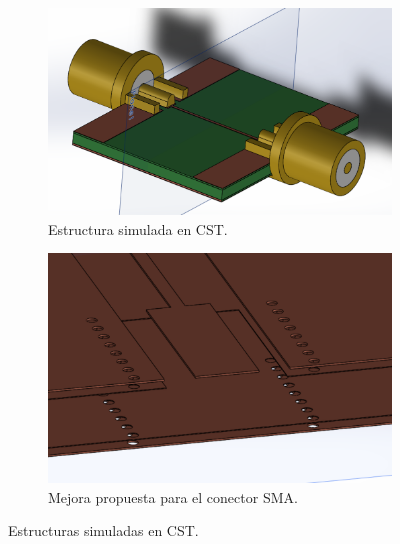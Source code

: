 \begin{figure}
    \centering

    \begin{subfigure}[b]{0.45\textwidth}
        \includegraphics[width=\textwidth]{images/sma_simulation_setup.png}
        \caption{Estructura simulada en CST.}
        \label{fig:sma_simulation_setup}
    \end{subfigure}
    \hfill
    \begin{subfigure}[b]{0.45\textwidth}
        \includegraphics[width=\textwidth]{images/sma_improvement_setup.png}
        \caption{Mejora propuesta para el conector SMA.}
        \label{fig:sma_improvement_setup}
    \end{subfigure}

    \caption{Estructuras simuladas en CST.}
        \label{fig:sma_simulations_setup}
\end{figure}

